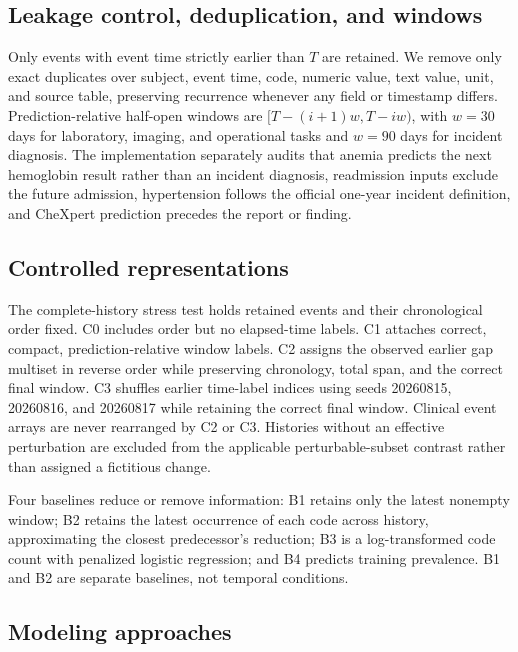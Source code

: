 \documentclass[pmlr,twocolumn,10pt]{jmlr}
\begin{document}
\subsection{Leakage control, deduplication, and windows}

Only events with event time strictly earlier than $T$ are retained. We remove
only exact duplicates over subject, event time, code, numeric value, text value,
unit, and source table, preserving recurrence whenever any field or timestamp
differs. Prediction-relative half-open windows are
$[T-(i+1)w,T-iw)$, with $w=30$ days for laboratory, imaging, and operational
tasks and $w=90$ days for incident diagnosis. The implementation separately
audits that anemia predicts the next hemoglobin result rather than an incident
diagnosis, readmission inputs exclude the future admission, hypertension follows
the official one-year incident definition, and CheXpert prediction precedes the
report or finding.

\subsection{Controlled representations}

The complete-history stress test holds retained events and their chronological
order fixed. C0 includes order but no elapsed-time labels. C1 attaches correct,
compact, prediction-relative window labels. C2 assigns the observed earlier gap
multiset in reverse order while preserving chronology, total span, and the
correct final window. C3 shuffles earlier time-label indices using seeds
20260815, 20260816, and 20260817 while retaining the correct final window.
Clinical event arrays are never rearranged by C2 or C3. Histories without an
effective perturbation are excluded from the applicable perturbable-subset
contrast rather than assigned a fictitious change.

Four baselines reduce or remove information: B1 retains only the latest
nonempty window; B2 retains the latest occurrence of each code across history,
approximating the closest predecessor's reduction; B3 is a log-transformed code
count with penalized logistic regression; and B4 predicts training prevalence.
B1 and B2 are separate baselines, not temporal conditions.

\subsection{Modeling approaches}
\end{document}

